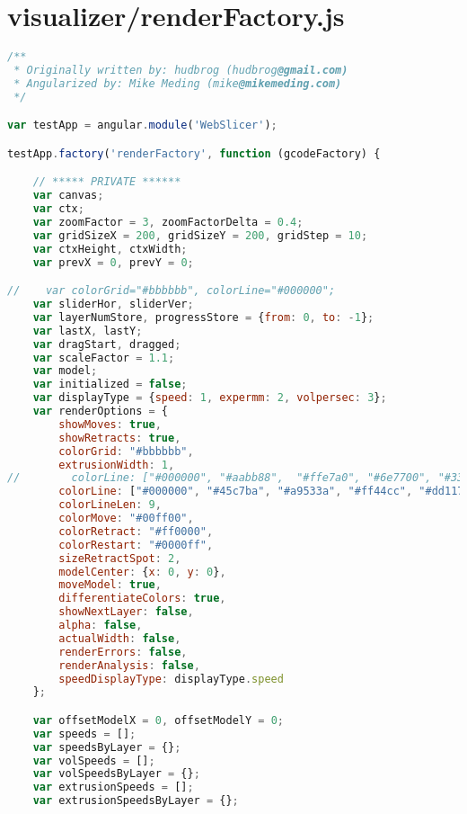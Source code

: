 \section{visualizer/renderFactory.js}
\begin{lstlisting}[language=JavaScript, label={lst:renderFactory}, caption=When render frames are requested this file compiles the lines of gcode from the worker and sets up the rest of the canvas frames.]
/**
 * Originally written by: hudbrog (hudbrog@gmail.com)
 * Angularized by: Mike Meding (mike@mikemeding.com)
 */

var testApp = angular.module('WebSlicer');

testApp.factory('renderFactory', function (gcodeFactory) {

    // ***** PRIVATE ******
    var canvas;
    var ctx;
    var zoomFactor = 3, zoomFactorDelta = 0.4;
    var gridSizeX = 200, gridSizeY = 200, gridStep = 10;
    var ctxHeight, ctxWidth;
    var prevX = 0, prevY = 0;

//    var colorGrid="#bbbbbb", colorLine="#000000";
    var sliderHor, sliderVer;
    var layerNumStore, progressStore = {from: 0, to: -1};
    var lastX, lastY;
    var dragStart, dragged;
    var scaleFactor = 1.1;
    var model;
    var initialized = false;
    var displayType = {speed: 1, expermm: 2, volpersec: 3};
    var renderOptions = {
        showMoves: true,
        showRetracts: true,
        colorGrid: "#bbbbbb",
        extrusionWidth: 1,
//        colorLine: ["#000000", "#aabb88",  "#ffe7a0", "#6e7700", "#331a00", "#44ba97", "#08262f", "#db0e00", "#ff9977"],
        colorLine: ["#000000", "#45c7ba", "#a9533a", "#ff44cc", "#dd1177", "#eeee22", "#ffbb55", "#ff5511", "#777788", "#ff0000", "#ffff00"],
        colorLineLen: 9,
        colorMove: "#00ff00",
        colorRetract: "#ff0000",
        colorRestart: "#0000ff",
        sizeRetractSpot: 2,
        modelCenter: {x: 0, y: 0},
        moveModel: true,
        differentiateColors: true,
        showNextLayer: false,
        alpha: false,
        actualWidth: false,
        renderErrors: false,
        renderAnalysis: false,
        speedDisplayType: displayType.speed
    };

    var offsetModelX = 0, offsetModelY = 0;
    var speeds = [];
    var speedsByLayer = {};
    var volSpeeds = [];
    var volSpeedsByLayer = {};
    var extrusionSpeeds = [];
    var extrusionSpeedsByLayer = {};



\end{lstlisting}

